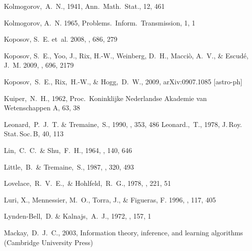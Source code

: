 \begin{thebibliography}{99}
  Kolmogorov,~A.~N., 1941,
  Ann.~Math.~Stat., 12, 461

{Kolmogorov}, A.~N. 1965, {Problems.~Inform.~Transmission}, 1, 1

{Koposov}, S.~E. {et~al.} 2008, \apj, 686, 279

{Koposov}, S.~E., {Yoo}, J., {Rix}, H.-W., {Weinberg}, D.~H., {Macci{\`o}},
  A.~V., \& {Escud{\'e}}, J.~M. 2009, \apj, 696, 2179

 Koposov,~S.~E., Rix,~H.-W., \& Hogg,~D.~W., 2009, arXiv:0907.1085 [astro-ph]

  Kuiper,~N.~H., 1962,
  Proc.~Koninklijke Nederlandse Akademie van Wetenschappen A, 63, 38

  Leonard,~P.~J.~T. \& Tremaine,~S., 1990,
  \apj, 353, 486
  Leonard.,~T., 1978,
  J.\,Roy.\,Stat.\,Soc.\,B, 40, 113

  Lin,~C.~C.~\& Shu,~F.~H., 1964,
  \apj, 140, 646

  Little,~B.~\& Tremaine,~S., 1987,
  \apj, 320, 493

  Lovelace,~R.~V.~E.,~\& Hohlfeld,~R.~G., 1978,
  \apj, 221, 51

{Luri}, X., {Mennessier}, M.~O., {Torra}, J., \& {Figueras}, F. 1996, \aaps,
  117, 405

  Lynden-Bell,~D. \& Kalnajs,~A.~J., 1972,
  \mnras, 157, 1

  Mackay,~D.~J.~C., 2003,
  Information theory, inference, and learning algorithms (Cambridge University Press)


\end{thebibliography}
